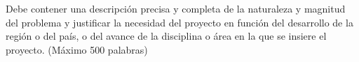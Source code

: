 \documentclass[../Main.tex]{subfiles}
\begin{document}
Debe contener una descripción precisa y completa de la naturaleza y magnitud del problema y
justificar la necesidad del proyecto en función del desarrollo de la región o del país, o del avance de
la disciplina o área en la que se insiere el proyecto.
(Máximo 500 palabras)
\end{document}
